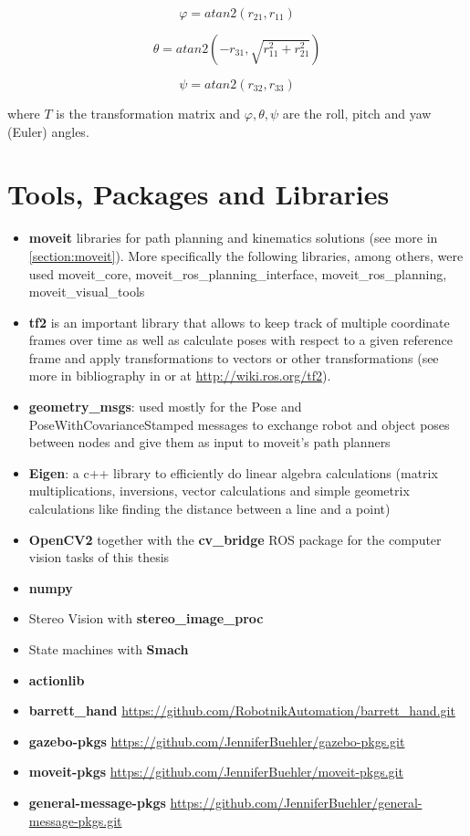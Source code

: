 \[
φ = atan2(r_{21}, r_{11})
\]

\[
θ = atan2(-r_{31}, \sqrt{r_{11}^2 + r_{21}^2})
\]

\[
ψ = atan2(r_{32}, r_{33})
\]

where $T$ is the transformation matrix and $φ, θ, ψ$ are the roll, pitch and yaw (Euler) angles.


\section{Tools, Packages and Libraries}

\begin{itemize}
	\item \textbf{moveit} libraries for path planning and kinematics solutions (see more in \ref{section:moveit}). More specifically the following libraries, among others, were used 
	moveit\_core, moveit\_ros\_planning\_interface, moveit\_ros\_planning, moveit\_visual\_tools
	\item \textbf{tf2} is an important library that allows to keep track of multiple coordinate frames over time as well as calculate poses with respect to a given reference frame and apply
	transformations to vectors or other transformations (see more in bibliography in \cite{6556373} or at \url{http://wiki.ros.org/tf2}).
	\item \textbf{geometry\_msgs}: used mostly for the Pose and PoseWithCovarianceStamped messages to exchange robot and object poses between nodes and give them as input to moveit's path planners
	\item \textbf{Eigen}: a c++ library to efficiently do linear algebra calculations (matrix multiplications, inversions, vector calculations and simple geometrix calculations like finding the distance between a line and a 
	point)
	\item \textbf{OpenCV2} together with the \textbf{cv\_bridge} ROS package for the computer vision tasks of this thesis
	\item \textbf{numpy}
	\item Stereo Vision with \textbf{stereo\_image\_proc}
	\item State machines with \textbf{Smach}
	\item \textbf{actionlib}
	\item \textbf{barrett\_hand} \url{https://github.com/RobotnikAutomation/barrett\_hand.git}
	\item \textbf{gazebo-pkgs} \url{https://github.com/JenniferBuehler/gazebo-pkgs.git}
	\item \textbf{moveit-pkgs} \url{https://github.com/JenniferBuehler/moveit-pkgs.git}
	\item \textbf{general-message-pkgs} \url{https://github.com/JenniferBuehler/general-message-pkgs.git}
\end{itemize}
